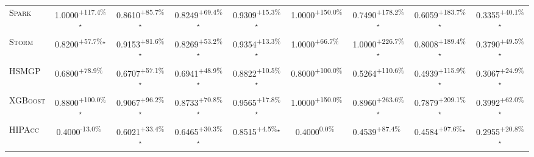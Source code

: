 \begin{table}[htbp]
\begin{tabular}{l|cccc|cccc}
\textsc{Spark} & \cellcolor{green!30}1.0000\textsuperscript{+117.4\%}$^\star$ & \cellcolor{green!30}0.8610\textsuperscript{+85.7\%}$^\star$ & \cellcolor{green!30}0.8249\textsuperscript{+69.4\%}$^\star$ & \cellcolor{green!30}0.9309\textsuperscript{+15.3\%}$^\star$ & \cellcolor{green!30}1.0000\textsuperscript{+150.0\%}$^{\,\,\,}$ & \cellcolor{green!30}0.7490\textsuperscript{+178.2\%}$^\star$ & \cellcolor{green!30}0.6059\textsuperscript{+183.7\%}$^\star$ & \cellcolor{green!30}0.3355\textsuperscript{+40.1\%}$^\star$ \\
\textsc{Storm} & \cellcolor{green!30}0.8200\textsuperscript{+57.7\%}$^\star$ & \cellcolor{green!30}0.9153\textsuperscript{+81.6\%}$^\star$ & \cellcolor{green!30}0.8269\textsuperscript{+53.2\%}$^\star$ & \cellcolor{green!30}0.9354\textsuperscript{+13.3\%}$^\star$ & \cellcolor{green!30}1.0000\textsuperscript{+66.7\%}$^{\,\,\,}$ & \cellcolor{green!30}1.0000\textsuperscript{+226.7\%}$^\star$ & \cellcolor{green!30}0.8008\textsuperscript{+189.4\%}$^\star$ & \cellcolor{green!30}0.3790\textsuperscript{+49.5\%}$^\star$ \\
\textsc{HSMGP} & \cellcolor{green!30}0.6800\textsuperscript{+78.9\%}$^{\,\,\,}$ & \cellcolor{green!30}0.6707\textsuperscript{+57.1\%}$^\star$ & \cellcolor{green!30}0.6941\textsuperscript{+48.9\%}$^\star$ & \cellcolor{green!30}0.8822\textsuperscript{+10.5\%}$^\star$ & \cellcolor{green!30}0.8000\textsuperscript{+100.0\%}$^{\,\,\,}$ & \cellcolor{green!30}0.5264\textsuperscript{+110.6\%}$^{\,\,\,}$ & \cellcolor{green!30}0.4939\textsuperscript{+115.9\%}$^\star$ & \cellcolor{green!30}0.3067\textsuperscript{+24.9\%}$^\star$ \\
\textsc{XGBoost} & \cellcolor{green!30}0.8800\textsuperscript{+100.0\%}$^\star$ & \cellcolor{green!30}0.9067\textsuperscript{+96.2\%}$^\star$ & \cellcolor{green!30}0.8733\textsuperscript{+70.8\%}$^\star$ & \cellcolor{green!30}0.9565\textsuperscript{+17.8\%}$^\star$ & \cellcolor{green!30}1.0000\textsuperscript{+150.0\%}$^{\,\,\,}$ & \cellcolor{green!30}0.8960\textsuperscript{+263.6\%}$^\star$ & \cellcolor{green!30}0.7879\textsuperscript{+209.1\%}$^\star$ & \cellcolor{green!30}0.3992\textsuperscript{+62.0\%}$^\star$ \\
\textsc{HIPAcc} & \cellcolor{red!30}0.4000\textsuperscript{-13.0\%}$^{\,\,\,}$ & \cellcolor{green!30}0.6021\textsuperscript{+33.4\%}$^\star$ & \cellcolor{green!30}0.6465\textsuperscript{+30.3\%}$^\star$ & \cellcolor{green!30}0.8515\textsuperscript{+4.5\%}$^\star$ & \cellcolor{red!30}0.4000\textsuperscript{0.0\%}$^{\,\,\,}$ & \cellcolor{green!30}0.4539\textsuperscript{+87.4\%}$^{\,\,\,}$ & \cellcolor{green!30}0.4584\textsuperscript{+97.6\%}$^\star$ & \cellcolor{green!30}0.2955\textsuperscript{+20.8\%}$^\star$ \\

\end{tabular}
\end{table}
